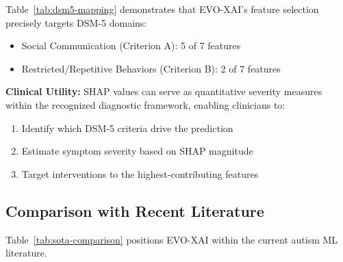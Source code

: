 \documentclass[pdflatex,sn-vancouver-num]{sn-jnl}
\providecommand{\tightlist}{%
  \setlength{\itemsep}{0pt}\setlength{\parskip}{0pt}}
\begin{document}
Table~\ref{tab:dsm5-mapping} demonstrates that EVO-XAI's feature selection precisely targets DSM-5 domains:
\begin{itemize}
\tightlist
\item Social Communication (Criterion A): 5 of 7 features
\item Restricted/Repetitive Behaviors (Criterion B): 2 of 7 features
\end{itemize}

\textbf{Clinical Utility:} SHAP values can serve as quantitative severity measures within the recognized diagnostic framework, enabling clinicians to:
\begin{enumerate}
\tightlist
\item Identify which DSM-5 criteria drive the prediction
\item Estimate symptom severity based on SHAP magnitude
\item Target interventions to the highest-contributing features
\end{enumerate}

\subsection{Comparison with Recent Literature}\label{comparison-with-recent-literature}

Table~\ref{tab:sota-comparison} positions EVO-XAI within the current autism ML literature.
\end{document}
